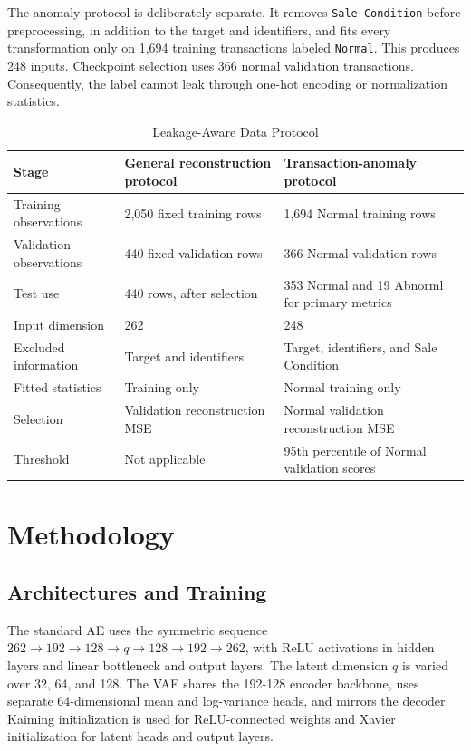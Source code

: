 \documentclass[11pt,letterpaper]{article}
\begin{document}
The anomaly protocol is deliberately separate. It removes \texttt{Sale Condition} before preprocessing, in addition to the target and identifiers, and fits every transformation only on 1,694 training transactions labeled \texttt{Normal}. This produces 248 inputs. Checkpoint selection uses 366 normal validation transactions. Consequently, the label cannot leak through one-hot encoding or normalization statistics.

\begin{table}[htbp]
\caption{Leakage-Aware Data Protocol}
\label{tab:data}
\centering
\begin{tabularx}{\textwidth}{lYY}
\toprule
Stage & General reconstruction protocol & Transaction-anomaly protocol \\
\midrule
Training observations & 2,050 fixed training rows & 1,694 Normal training rows \\
Validation observations & 440 fixed validation rows & 366 Normal validation rows \\
Test use & 440 rows, after selection & 353 Normal and 19 Abnorml for primary metrics \\
Input dimension & 262 & 248 \\
Excluded information & Target and identifiers & Target, identifiers, and Sale Condition \\
Fitted statistics & Training only & Normal training only \\
Selection & Validation reconstruction MSE & Normal validation reconstruction MSE \\
Threshold & Not applicable & 95th percentile of Normal validation scores \\
\bottomrule
\end{tabularx}
\end{table}

\section{Methodology}
\subsection{Architectures and Training}
The standard AE uses the symmetric sequence $262\rightarrow192\rightarrow128\rightarrow q\rightarrow128\rightarrow192\rightarrow262$, with ReLU activations in hidden layers and linear bottleneck and output layers. The latent dimension $q$ is varied over 32, 64, and 128. The VAE shares the 192-128 encoder backbone, uses separate 64-dimensional mean and log-variance heads, and mirrors the decoder. Kaiming initialization is used for ReLU-connected weights and Xavier initialization for latent heads and output layers.
\end{document}
